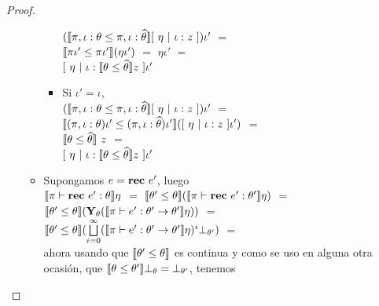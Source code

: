 \begin{proof}
\begin{itemize}
\begin{itemize}
\begin{itemize}
$(\llbracket \pi,\iota:\theta \leq \pi,\iota:\widehat{\theta} \rrbracket[ \ \eta \ | \ \iota:z \ ])\iota'$ $=$\\
$\llbracket \pi\iota' \leq \pi\iota' \rrbracket(\eta\iota')$ $=$
$\eta\iota'$ $=$\\
$[ \ \eta \ | \ \iota:\llbracket \theta \leq \widehat{\theta} \rrbracket z \ ]\iota'$

\item Si $\iota' = \iota$, \\

$(\llbracket \pi,\iota:\theta \leq \pi,\iota:\widehat{\theta} \rrbracket[ \ \eta \ | \ \iota:z \ ])\iota'$ $=$\\
$\semBrcks{(\pi,\iota:\theta)\iota' \leq (\pi,\iota:\thetahat)\iota'}
											([ \ \eta \ | \ \iota:z \ ]\iota')$ $=$\\
$\llbracket \theta \leq \widehat{\theta} \rrbracket \ z$ $=$\\
$[ \ \eta \ | \ \iota:\llbracket \theta \leq \widehat{\theta} \rrbracket z \ ]\iota'$

\end{itemize}

\item Supongamos $e = \textbf{rec} \ e'$, luego \\

$\llbracket \pi \vdash \textbf{rec} \ e' : \theta \rrbracket \eta$ $=$ 
$\llbracket \theta' \leq \theta \rrbracket (\llbracket \pi \vdash \textbf{rec} \ e' : \theta' \rrbracket \eta)$ $=$\\
$\llbracket \theta' \leq \theta \rrbracket 
	(\textbf{Y}_{\theta} (\llbracket \pi \vdash e' : \theta' \rightarrow \theta' \rrbracket\eta))$ $=$\\
$\llbracket \theta' \leq \theta \rrbracket 
	(\bigsqcup\limits^{\infty}_{i=0} 
	(\llbracket \pi \vdash e' : \theta' \rightarrow \theta' \rrbracket\eta)^{i} \bot_{\theta'})$ $=$\\
	
ahora usando que $\llbracket \theta' \leq \theta \rrbracket$ es continua y como se uso en
alguna otra ocasi\'on, que $\llbracket \theta \leq \theta' \rrbracket \bot_{\theta} = \bot_{\theta'}$,
tenemos\\
	

\end{itemize}
\end{itemize}
\end{proof}
